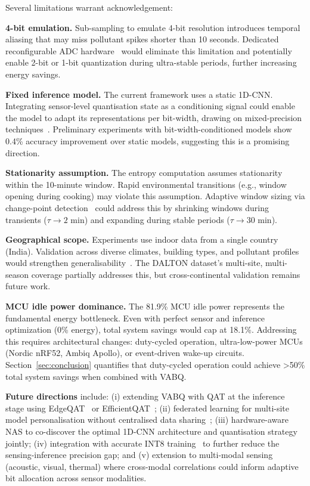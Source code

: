Several limitations warrant acknowledgement:

\textbf{4-bit emulation.} Sub-sampling to emulate 4-bit resolution introduces temporal aliasing that may miss pollutant spikes shorter than 10 seconds. Dedicated reconfigurable ADC hardware~\cite{reconfigADC2025} would eliminate this limitation and potentially enable 2-bit or 1-bit quantization during ultra-stable periods, further increasing energy savings.

\textbf{Fixed inference model.} The current framework uses a static 1D-CNN. Integrating sensor-level quantisation state as a conditioning signal could enable the model to adapt its representations per bit-width, drawing on mixed-precision techniques~\cite{dong2024efficient, dybit2023, edgempq2024}. Preliminary experiments with bit-width-conditioned models show 0.4\% accuracy improvement over static models, suggesting this is a promising direction.

\textbf{Stationarity assumption.} The entropy computation assumes stationarity within the 10-minute window. Rapid environmental transitions (e.g., window opening during cooking) may violate this assumption. Adaptive window sizing via change-point detection~\cite{atitallah2023autonomous} could address this by shrinking windows during transients ($\tau \rightarrow 2$ min) and expanding during stable periods ($\tau \rightarrow 30$ min).

\textbf{Geographical scope.} Experiments use indoor data from a single country (India). Validation across diverse climates, building types, and pollutant profiles would strengthen generalisability~\cite{forecasting2024iaq, dimitriou2025innovations}. The DALTON dataset's multi-site, multi-season coverage partially addresses this, but cross-continental validation remains future work.

\textbf{MCU idle power dominance.} The 81.9\% MCU idle power represents the fundamental energy bottleneck. Even with perfect sensor and inference optimization (0\% energy), total system savings would cap at 18.1\%. Addressing this requires architectural changes: duty-cycled operation, ultra-low-power MCUs (Nordic nRF52, Ambiq Apollo), or event-driven wake-up circuits. Section~\ref{sec:conclusion} quantifies that duty-cycled operation could achieve >50\% total system savings when combined with VABQ.

\textbf{Future directions} include: (i) extending VABQ with QAT at the inference stage using EdgeQAT~\cite{edgeqat2024} or EfficientQAT~\cite{efficientqat2024}; (ii) federated learning for multi-site model personalisation without centralised data sharing~\cite{tinytrain2024}; (iii) hardware-aware NAS to co-discover the optimal 1D-CNN architecture and quantisation strategy jointly; (iv) integration with accurate INT8 training~\cite{accurateint8_2025} to further reduce the sensing-inference precision gap; and (v) extension to multi-modal sensing (acoustic, visual, thermal) where cross-modal correlations could inform adaptive bit allocation across sensor modalities.
